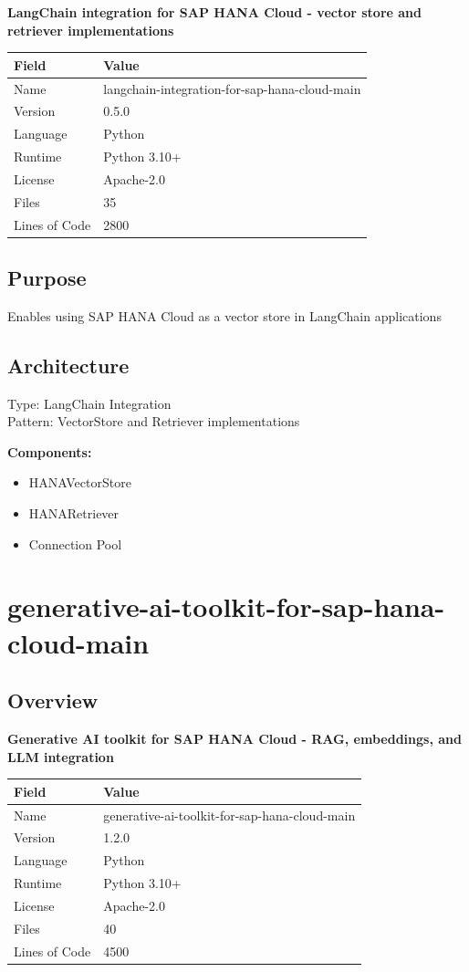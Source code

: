 \documentclass[11pt,a4paper]{article}
\begin{document}
\textbf{LangChain integration for SAP HANA Cloud - vector store and retriever implementations}

\begin{tabular}{@{}ll@{}}
\toprule
\textbf{Field} & \textbf{Value} \\
\midrule
Name & langchain-integration-for-sap-hana-cloud-main \\
Version & 0.5.0 \\
Language & Python \\
Runtime & Python 3.10+ \\
License & Apache-2.0 \\
Files & 35 \\
Lines of Code & 2800 \\
\bottomrule
\end{tabular}

\subsection{Purpose}
Enables using SAP HANA Cloud as a vector store in LangChain applications

\subsection{Architecture}
Type: LangChain Integration \\
Pattern: VectorStore and Retriever implementations

\textbf{Components:}\begin{itemize}[noitemsep]
\item HANAVectorStore
\item HANARetriever
\item Connection Pool
\end{itemize}

\newpage


\section{generative-ai-toolkit-for-sap-hana-cloud-main}

\subsection{Overview}

\textbf{Generative AI toolkit for SAP HANA Cloud - RAG, embeddings, and LLM integration}

\begin{tabular}{@{}ll@{}}
\toprule
\textbf{Field} & \textbf{Value} \\
\midrule
Name & generative-ai-toolkit-for-sap-hana-cloud-main \\
Version & 1.2.0 \\
Language & Python \\
Runtime & Python 3.10+ \\
License & Apache-2.0 \\
Files & 40 \\
Lines of Code & 4500 \\
\bottomrule
\end{tabular}
\end{document}
